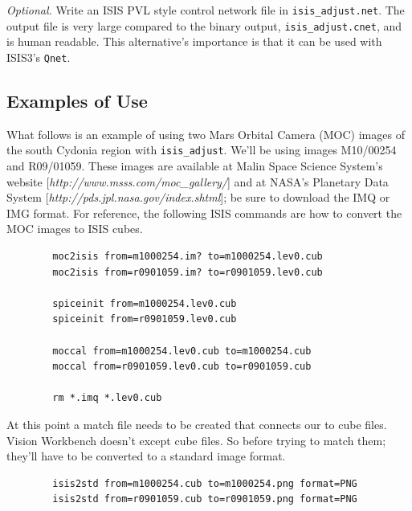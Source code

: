 \emph{Optional.} Write an ISIS PVL style control network file in
\verb=isis_adjust.net=. The output file is very large compared to the
binary output, \verb=isis_adjust.cnet=, and is human readable. This
alternative's importance is that it can be used with ISIS3's
\texttt{Qnet}.

\subsection{Examples of Use}


What follows is an example of using two Mars Orbital Camera (MOC)
images of the south Cydonia region with \texttt{isis\_adjust}. We'll
be using images M10/00254 and R09/01059. These images are available
at Malin Space Science System's website
[\emph{http://www.msss.com/moc\_gallery/}] and at NASA's Planetary
Data System [\emph{http://pds.jpl.nasa.gov/index.shtml}]; be sure to
download the IMQ or IMG format. For reference, the following ISIS commands
are how to convert the MOC images to ISIS cubes.

\begin{verbatim}
        moc2isis from=m1000254.im? to=m1000254.lev0.cub
        moc2isis from=r0901059.im? to=r0901059.lev0.cub

        spiceinit from=m1000254.lev0.cub
        spiceinit from=r0901059.lev0.cub

        moccal from=m1000254.lev0.cub to=m1000254.cub
        moccal from=r0901059.lev0.cub to=r0901059.cub

        rm *.imq *.lev0.cub
\end{verbatim}

At this point a match file needs to be created that connects our to
cube files. Vision Workbench doesn't except cube files. So before
trying to match them; they'll have to be converted to a standard image
format.

\begin{verbatim}
        isis2std from=m1000254.cub to=m1000254.png format=PNG
        isis2std from=r0901059.cub to=r0901059.png format=PNG
\end{verbatim}

